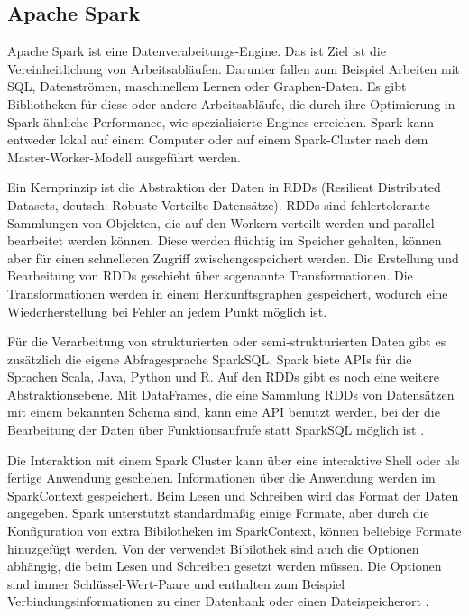 \subsection{Apache Spark}
\label{sec:spark}

Apache Spark ist eine Datenverabeitungs-Engine.
Das ist Ziel ist die Vereinheitlichung von Arbeitsabläufen.
Darunter fallen zum Beispiel Arbeiten mit SQL, Datenströmen, maschinellem Lernen oder Graphen-Daten.
Es gibt Bibliotheken für diese oder andere Arbeitsabläufe, die durch ihre Optimierung in Spark ähnliche Performance, wie spezialisierte Engines erreichen.
Spark kann entweder lokal auf einem Computer oder auf einem Spark-Cluster nach dem Master-Worker-Modell ausgeführt werden.

Ein Kernprinzip ist die Abstraktion der Daten in RDDs (Resilient Distributed Datasets, deutsch: Robuste Verteilte Datensätze).
RDDs sind fehlertolerante Sammlungen von Objekten, die auf den Workern verteilt werden und parallel bearbeitet werden können.
Diese werden flüchtig im Speicher gehalten, können aber für einen schnelleren Zugriff zwischengespeichert werden.
Die Erstellung und Bearbeitung von RDDs geschieht über sogenannte Transformationen.
Die Transformationen werden in einem Herkunftsgraphen gespeichert, wodurch eine Wiederherstellung bei Fehler an jedem Punkt möglich ist.

Für die Verarbeitung von strukturierten oder semi-strukturierten Daten gibt es zusätzlich die eigene Abfragesprache SparkSQL.
Spark biete APIs für die Sprachen Scala, Java, Python und R.
Auf den RDDs gibt es noch eine weitere Abstraktionsebene.
Mit DataFrames, die eine Sammlung RDDs von Datensätzen mit einem bekannten Schema sind, kann eine API benutzt werden, bei der die Bearbeitung der Daten über Funktionsaufrufe statt SparkSQL möglich ist \parencite{spark}.

Die Interaktion mit einem Spark Cluster kann über eine interaktive Shell oder als fertige Anwendung geschehen.
Informationen über die Anwendung werden im SparkContext gespeichert.
Beim Lesen und Schreiben wird das Format der Daten angegeben.
Spark unterstützt standardmäßig einige Formate, aber durch die Konfiguration von extra Bibilotheken im SparkContext, können beliebige Formate hinuzgefügt werden.
Von der verwendet Bibilothek sind auch die Optionen abhängig, die beim Lesen und Schreiben gesetzt werden müssen.
Die Optionen sind immer Schlüssel-Wert-Paare und enthalten zum Beispiel Verbindungsinformationen zu einer Datenbank oder einen Dateispeicherort \parencite{spark-website}.
